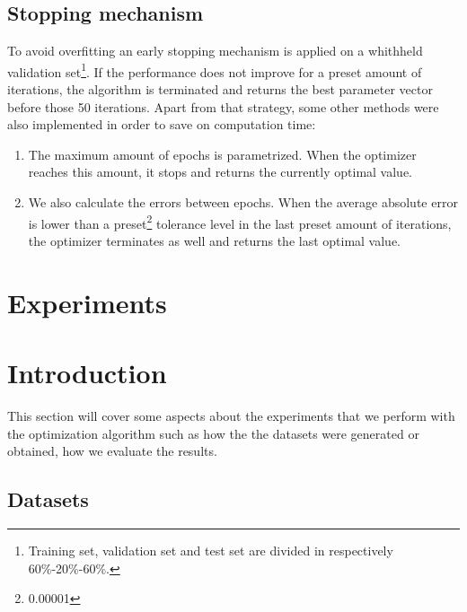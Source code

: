 \subsection{Stopping mechanism}
To avoid overfitting an early stopping mechanism is applied on a whithheld validation set\footnote{Training set, validation set and test set are divided 
in respectively 60\%-20\%-60\%.}. If the performance does not improve for a preset amount of iterations, the algorithm is terminated and returns the best parameter vector before those 50 iterations.
Apart from that strategy, some other methods were also implemented in order to save on computation time:
\begin{enumerate}
 \item The maximum amount of epochs is parametrized. When the optimizer reaches this amount, it stops and returns the currently optimal value.
 \item We also calculate the errors between epochs. When the average absolute error is lower than a preset\footnote{0.00001} tolerance level in the last preset amount of iterations, the optimizer terminates as well and returns the last optimal value.
\end{enumerate}
 \section{Experiments}
 \section{Introduction}
 This section will cover some aspects about the experiments that we perform with the optimization algorithm such as
 how the the datasets were generated or obtained, how we evaluate the results. 
 \subsection{Datasets}
